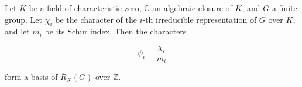 Let $K$ be a field of characteristic zero, $\mathbb{C}$ an algebraic closure of $K$, and $G$ a finite group. Let $\chi_i$ be the character of the $i$-th irreducible representation of $G$ over $K$, and let $m_i$ be its Schur index. Then the characters

$$\psi_i = \frac{\chi_i}{m_i}$$

form a basis of $\overline{R}_K(G)$ over $\mathbb{Z}$.
